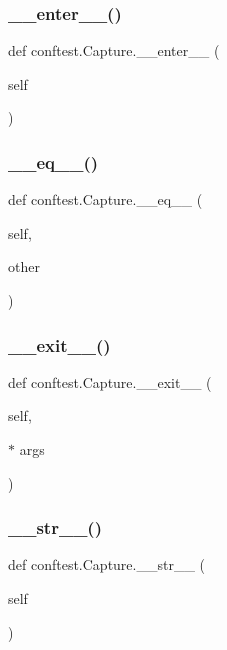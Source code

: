 \subsubsection{\texorpdfstring{\_\_enter\_\_()}{\_\_enter\_\_()}}
{\footnotesize\ttfamily def conftest.\+Capture.\+\_\+\+\_\+enter\+\_\+\+\_\+ (\begin{DoxyParamCaption}\item[{}]{self }\end{DoxyParamCaption})}

\mbox{\label{classconftest_1_1_capture_ade6db8e0c1632191d9590e977e088117}} 
\subsubsection{\texorpdfstring{\_\_eq\_\_()}{\_\_eq\_\_()}}
{\footnotesize\ttfamily def conftest.\+Capture.\+\_\+\+\_\+eq\+\_\+\+\_\+ (\begin{DoxyParamCaption}\item[{}]{self,  }\item[{}]{other }\end{DoxyParamCaption})}

\mbox{\label{classconftest_1_1_capture_ab2f421f21b8cbfbf330548c1c97d6d71}} 
\subsubsection{\texorpdfstring{\_\_exit\_\_()}{\_\_exit\_\_()}}
{\footnotesize\ttfamily def conftest.\+Capture.\+\_\+\+\_\+exit\+\_\+\+\_\+ (\begin{DoxyParamCaption}\item[{}]{self,  }\item[{$\ast$}]{args }\end{DoxyParamCaption})}

\mbox{\label{classconftest_1_1_capture_adb548312469db42e343100c63031604b}} 
\subsubsection{\texorpdfstring{\_\_str\_\_()}{\_\_str\_\_()}}
{\footnotesize\ttfamily def conftest.\+Capture.\+\_\+\+\_\+str\+\_\+\+\_\+ (\begin{DoxyParamCaption}\item[{}]{self }\end{DoxyParamCaption})}

